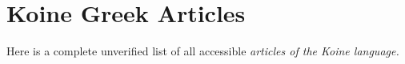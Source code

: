 \documentclass[10pt]{memoir}
\begin{document}
    \section*{Koine Greek Articles}
    Here is a complete unverified list of all accessible \em articles \normal of the Koine language.

\end{document}
